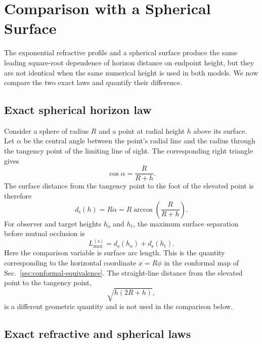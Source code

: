 \section{Comparison with a Spherical Surface}
\label{sec:spherical-comparison}

The exponential refractive profile and a spherical surface produce the same
leading square-root dependence of horizon distance on endpoint height, but
they are not identical when the same numerical height is used in both models.
We now compare the two exact laws and quantify their difference.

\subsection{Exact spherical horizon law}

Consider a sphere of radius $R$ and a point at radial height $h$ above its
surface. Let $\alpha$ be the central angle between the point's radial line and
the radius through the tangency point of the limiting line of sight. The
corresponding right triangle gives
\begin{equation}
    \cos\alpha
    =
    \frac{R}{R+h}.
    \label{eq:spherical-horizon-angle}
\end{equation}
The surface distance from the tangency point to the foot of the elevated point
is therefore
\begin{equation}
    d_{\mathrm{s}}(h)
    =
    R\alpha
    =
    R\arccos\!\left(\frac{R}{R+h}\right).
    \label{eq:exact-spherical-horizon-distance}
\end{equation}
For observer and target heights $h_{\mathrm{o}}$ and $h_{\mathrm{t}}$, the
maximum surface separation before mutual occlusion is
\begin{equation}
    L_{\max}^{(\mathrm{s})}
    =
    d_{\mathrm{s}}(h_{\mathrm{o}})
    +
    d_{\mathrm{s}}(h_{\mathrm{t}}).
    \label{eq:exact-spherical-maximum-separation}
\end{equation}
Here the comparison variable is surface arc length. This is the quantity
corresponding to the horizontal coordinate $x=R\phi$ in the conformal map of
Sec.~\ref{sec:conformal-equivalence}. The straight-line distance from the
elevated point to the tangency point,
\begin{equation}
    \sqrt{h(2R+h)},
\end{equation}
is a different geometric quantity and is not used in the comparison below.

\subsection{Exact refractive and spherical laws}

